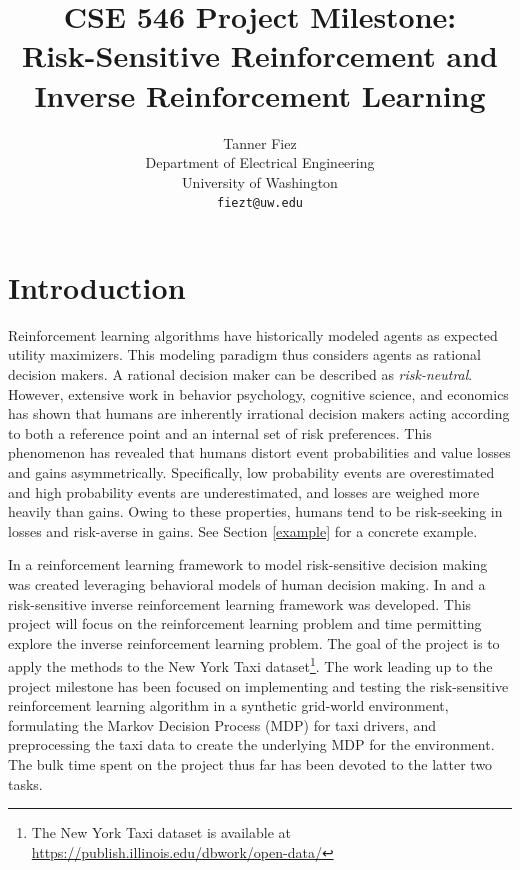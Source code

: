 \documentclass{article}
\title{CSE 546 Project Milestone: \\ {Risk-Sensitive Reinforcement and Inverse Reinforcement Learning}}
\author{
  Tanner Fiez \\
  Department of Electrical Engineering \\
  University of Washington \\
  \texttt{fiezt@uw.edu} \\
}
\begin{document}
\maketitle

\section{Introduction}
Reinforcement learning algorithms have historically modeled agents as expected utility maximizers. This modeling paradigm thus considers agents as rational decision makers. A rational decision maker can be described as \emph{risk-neutral}. However, extensive work in behavior psychology, cognitive science, and economics has shown that humans are inherently irrational decision makers acting according to both a reference point and an internal set of risk preferences. This phenomenon has revealed that humans distort event probabilities and value losses and gains asymmetrically. Specifically, low probability events are overestimated and high probability events are underestimated, and losses are weighed more heavily than gains. Owing to these properties, humans tend to be risk-seeking in losses and risk-averse in gains. See Section \ref{example} for a concrete example.

In \cite{DBLP:journals/corr/ShenTSO13} a reinforcement learning framework to model risk-sensitive decision making was created leveraging behavioral models of human decision making. In \cite{mazumdar:2017aa} and \cite{ratliff:2017aa} a risk-sensitive inverse reinforcement learning framework was developed. This project will focus on the reinforcement learning problem and time permitting explore the inverse reinforcement learning problem. The goal of the project is to apply the methods to the New York Taxi dataset\footnote{The New York Taxi dataset is available at \url{https://publish.illinois.edu/dbwork/open-data/}}. The work leading up to the project milestone has been focused on implementing and testing the risk-sensitive reinforcement learning algorithm in a synthetic grid-world environment, formulating the Markov Decision Process (MDP) for taxi drivers, and preprocessing the taxi data to create the underlying MDP for the environment. The bulk time spent on the project thus far has been devoted to the latter two tasks.
\end{document}
